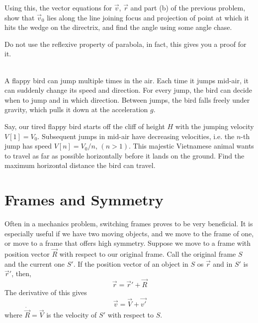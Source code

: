 \begin{exc}
\begin{exercise}[subtitle={Projectiles with Vector, V2.}, points = 3]
            Using this, the vector equations for $\vec{v}$, $\vec{r}$ and part (b) of the previous problem,
            show that $\vec{v}_0$ lies along the line joining focus and 
            projection of point at which it hits the wedge on the directrix, and find the angle using some angle chase.
            
            Do not use the reflexive property of parabola, in fact, this gives you a proof for it.
        \end{exercise}

        \begin{exercise}[subtitle={Tired Flappy Bird, OPhO}, points = 4]
            \smallskip
            ~\\
            A flappy bird can jump multiple times in the air. Each time it jumps
            mid-air, it can suddenly change its speed and direction. For every jump, the bird can decide when to jump
            and in which direction. Between jumps, the bird falls freely under gravity, which pulls it down at the
            acceleration $g$. 
            
            Say, our tired flappy bird starts off the cliff of height $H$ with the jumping velocity $V [1] = V_0$.
            Subsequent jumps in mid-air have decreasing velocities, i.e. the $n$-th jump has speed $V [n] = V_0/n$, $(n > 1)$.
            This majestic Vietnamese animal wants to travel as far as possible horizontally before it lands on the
            ground. Find the maximum horizontal distance the bird can travel.
        \end{exercise}
    \end{exc}

    \section{Frames and Symmetry}  
    
    Often in a mechanics problem, switching frames proves to be very beneficial. It is especially useful 
    if we have two moving objects, and we move to the frame of one, or move to a frame that offers high 
    symmetry. Suppose we move to a frame with position vector $\vec{R}$ with respect to our original frame. 
    Call the original frame $S$ and the current one $S'$. If the position vector of an object in $S$ os $\vec{r}$
    and in $S'$ is $\vec{r}'$, then,
    \begin{equation}
        \vec{r} = \vec{r}' + \vec{R}        
    \end{equation}
    The derivative of this gives 
    \begin{equation}
        \vec{v} = \vec{V} + \vec{v'}
    \end{equation}
    where $\dot{\vec{R}} = \vec{V}$ is the velocity of $S'$ with respect to $S$.
    
